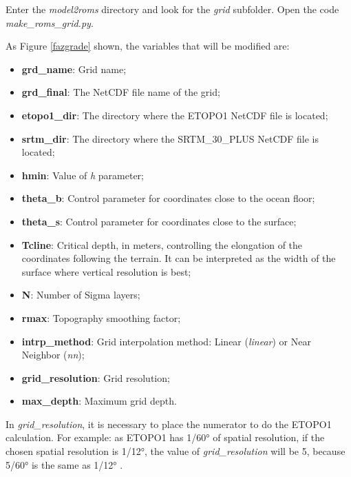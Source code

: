 \noindent Enter the \textit{model2roms} directory and look for the \textit{grid} subfolder. Open the code \textit{make\_roms\_grid.py}.
\bigskip

\bigskip

\noindent As Figure \textcolor{bleu_cite}{\ref{fazgrade}} shown, the variables that will be modified are:
\bigskip

\begin{itemize}
\item \textbf{grd\_name}: Grid name;
\item \textbf{grd\_final}: The NetCDF file name of the grid;
\item \textbf{etopo1\_dir}: The directory where the ETOPO1 NetCDF file is located;
\item\textbf{srtm\_dir}: The directory where the SRTM\_30\_PLUS NetCDF file is located; 
\item \textbf{hmin}: Value of \textit{h} parameter;
\item \textbf{theta\_b}: Control parameter for coordinates close to the ocean floor;
\item \textbf{theta\_s}: Control parameter for coordinates close to the surface;
\item \textbf{Tcline}: Critical depth, in meters, controlling the elongation of the coordinates following the terrain. It can be interpreted as the width of the surface where vertical resolution is best;
\item \textbf{N}: Number of Sigma layers;
\item \textbf{rmax}: Topography smoothing factor;
\item \textbf{intrp\_method}: Grid interpolation method: Linear (\textit{linear}) or Near Neighbor (\textit{nn});
\item \textbf{grid\_resolution}: Grid resolution;
\item\textbf{max\_depth}: Maximum grid depth.
\end{itemize}
\bigskip

\begin{tcolorbox}[enhanced,
    grow to left by   = 0cm,
    grow to right by  = 0cm,
    enlarge top by    = 0cm,
    enlarge bottom by = 0cm,
    tcbox raise base,
    boxrule           = 1.0pt,
    left              = 18mm,
    colframe          = red!50!black,coltext=red!25!black,colback=red!10!white,
    overlay           = {\begin{tcbclipinterior}\fill[red!75!blue!50!white] (frame.south west)
      rectangle node[text=white,font=\sffamily\bfseries\footnotesize,rotate=0] {WARNING} ([xshift=18mm]frame.north west);\end{tcbclipinterior}}]
      In \textit{grid\_resolution}, it is necessary to place the numerator to do the ETOPO1 calculation. For example: as ETOPO1 has 1/60° of spatial resolution, if the chosen spatial resolution is 1/12°, the value of \textit{grid\_resolution} will be 5, because 5/60° is the same as 1/12° .\end{tcolorbox}
\bigskip

